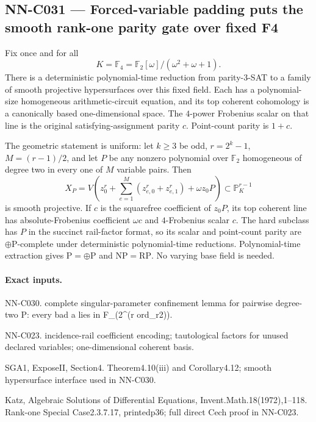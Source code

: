\subsection{NN-C031 --- Forced-variable padding puts the smooth rank-one parity gate over fixed F4}
\begin{proposition}[NN-C031]
Fix once and for all
\[
 K=\mathbb F_4=\mathbb F_2[\omega]/(\omega^2+\omega+1).
\]
There is a deterministic polynomial-time reduction from parity-3-SAT to a family of smooth projective hypersurfaces over this fixed field. Each has a polynomial-size homogeneous arithmetic-circuit equation, and its top coherent cohomology is a canonically based one-dimensional space. The $4$-power Frobenius scalar on that line is the original satisfying-assignment parity $c$. Point-count parity is $1+c$.

The geometric statement is uniform: let $k\geq3$ be odd, $r=2^k-1$, $M=(r-1)/2$, and let $P$ be any nonzero polynomial over $\mathbb F_2$ homogeneous of degree two in every one of $M$ variable pairs. Then
\[
 X_P=V\left(z_0^r+\sum_{e=1}^{M}(z_{e,0}^r+z_{e,1}^r)
                         +\omega z_0P\right)
                       \subset\mathbb P^{r-1}_K
\]
is smooth projective. If $c$ is the squarefree coefficient of $z_0P$, its top coherent line has absolute-Frobenius coefficient $\omega c$ and $4$-Frobenius scalar $c$. The hard subclass has $P$ in the succinct rail-factor format, so its scalar and point-count parity are $\oplus\mathrm P$-complete under deterministic polynomial-time reductions. Polynomial-time extraction gives $\mathrm P=\oplus\mathrm P$ and $\mathrm{NP}=\mathrm{RP}$. No varying base field is needed.
\end{proposition}
\paragraph{Exact inputs.}
NN-C030. complete singular-parameter confinement lemma for pairwise degree-two P: every bad a lies in F\_(2\textasciicircum{}(r ord\_r2)).

NN-C023. incidence-rail coefficient encoding; tautological factors for unused declared variables; one-dimensional coherent basis.

SGA1, ExposeII, Section4. Theorem4.10(iii) and Corollary4.12; smooth hypersurface interface used in NN-C030.

Katz, Algebraic Solutions of Differential Equations, Invent.Math.18(1972),1--118. Rank-one Special Case2.3.7.17, printedp36; full direct Cech proof in NN-C023.

